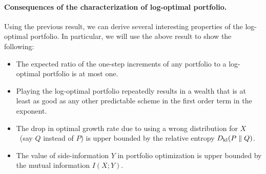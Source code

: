     \paragraph{Consequences of the characterization of log-optimal portfolio.} Using the previous result, we can derive several interesting properties of the log-optimal portfolio. In particular, we will use the above result to show the following: 
    \begin{itemize}
        \item The expected ratio of the one-step increments of any portfolio to a log-optimal portfolio is at most one. 

        \item Playing the log-optimal portfolio repeatedly results in a wealth that is at least as good as any other predictable scheme in the first order term in the exponent. 

        \item The drop in optimal growth rate due to using a wrong distribution for $X$~(say $Q$ instead of $P$) is upper bounded by the relative entropy $D_{\text{kl}}(P \parallel Q)$. 
        
        \item The value of side-information $Y$ in portfolio optimization is upper bounded by the mutual information $I(X;Y)$. 
    \end{itemize}
    
